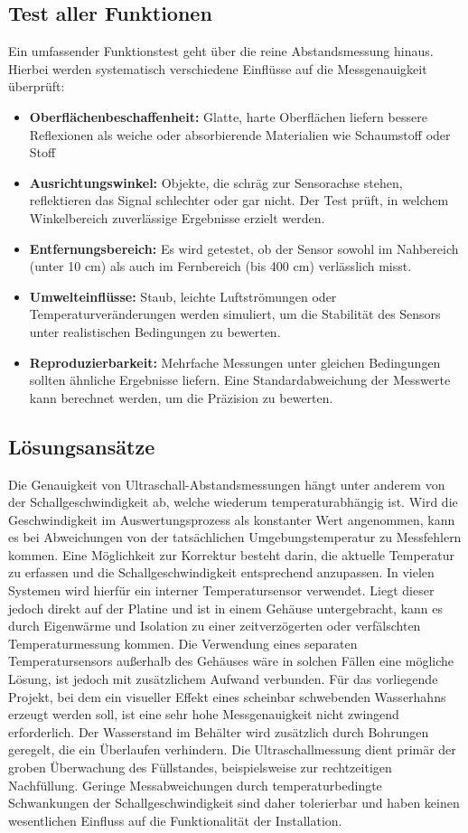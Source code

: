 \subsection*{Test aller Funktionen}
Ein umfassender Funktionstest geht über die reine Abstandsmessung hinaus. Hierbei werden
systematisch verschiedene Einflüsse auf die Messgenauigkeit überprüft: \cite{Hering:2023}
\begin{itemize}
	\item \textbf{Oberflächenbeschaffenheit:} Glatte, harte Oberflächen liefern bessere Reflexionen als
	weiche oder absorbierende Materialien wie Schaumstoff oder Stoff
	\item \textbf{Ausrichtungswinkel:} Objekte, die schräg zur Sensorachse stehen, reflektieren das
	Signal schlechter oder gar nicht. Der Test prüft, in welchem Winkelbereich zuverlässige
	Ergebnisse erzielt werden.
	\item \textbf{Entfernungsbereich:} Es wird getestet, ob der Sensor sowohl im Nahbereich (unter
	10 cm) als auch im Fernbereich (bis 400 cm) verlässlich misst.
	\item \textbf{Umwelteinflüsse:} Staub, leichte Luftströmungen oder Temperaturveränderungen
	werden simuliert, um die Stabilität des Sensors unter realistischen Bedingungen zu
	bewerten.
	\item \textbf{Reproduzierbarkeit:} Mehrfache Messungen unter gleichen Bedingungen sollten
	ähnliche Ergebnisse liefern. Eine Standardabweichung der Messwerte kann berechnet
	werden, um die Präzision zu bewerten.
\end{itemize}

\subsection*{Lösungsansätze}
Die Genauigkeit von Ultraschall-Abstandsmessungen hängt unter anderem von der Schallgeschwindigkeit ab, welche wiederum temperaturabhängig ist. Wird die Geschwindigkeit im Auswertungsprozess als konstanter Wert angenommen, kann es bei Abweichungen von der tatsächlichen Umgebungstemperatur zu Messfehlern kommen. Eine Möglichkeit zur Korrektur besteht darin, die aktuelle Temperatur zu erfassen und die Schallgeschwindigkeit entsprechend anzupassen.
In vielen Systemen wird hierfür ein interner Temperatursensor verwendet. Liegt dieser jedoch direkt auf der Platine und ist in einem Gehäuse untergebracht, kann es durch Eigenwärme und Isolation zu einer zeitverzögerten oder verfälschten Temperaturmessung kommen. Die Verwendung eines separaten Temperatursensors außerhalb des Gehäuses wäre in solchen Fällen eine mögliche Lösung, ist jedoch mit zusätzlichem Aufwand verbunden.
Für das vorliegende Projekt, bei dem ein visueller Effekt eines scheinbar schwebenden Wasserhahns erzeugt werden soll, ist eine sehr hohe Messgenauigkeit nicht zwingend erforderlich. Der Wasserstand im Behälter wird zusätzlich durch Bohrungen geregelt, die ein Überlaufen verhindern. Die Ultraschallmessung dient primär der groben Überwachung des Füllstandes, beispielsweise zur rechtzeitigen Nachfüllung. Geringe Messabweichungen durch temperaturbedingte Schwankungen der Schallgeschwindigkeit sind daher tolerierbar und haben keinen wesentlichen Einfluss auf die Funktionalität der Installation.

